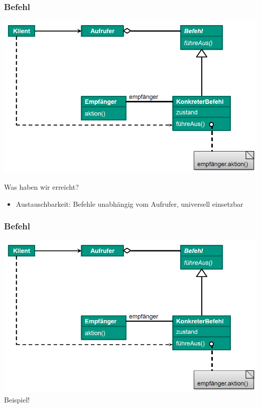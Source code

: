 \documentclass[18pt]{beamer}
\begin{document}
	\begin{frame}
		\frametitle{Befehl}
		\includegraphics[scale=0.35]{./pics/tut4/command.png}
		\begin{block}{Was haben wir erreicht?}
			\begin{itemize}
				 \pause
				\item Austauschbarkeit: Befehle unabhängig vom Aufrufer, universell einsetzbar
			\end{itemize}
		\end{block}
	\end{frame}
	
	\begin{frame}
		\frametitle{Befehl}
		\includegraphics[scale=0.35]{./pics/tut4/command.png}
		\linebreak
		\centering \large Beispiel!
	\end{frame}
	
\end{document}
